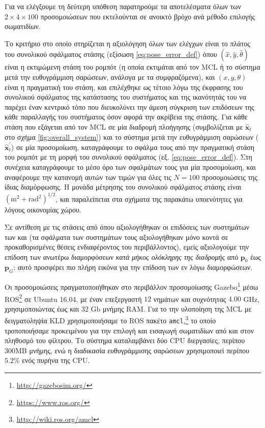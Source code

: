 Για να ελέγξουμε τη δεύτερη υπόθεση παρατηρούμε τα αποτελέσματα όλων των
$2\times4\times100$ προσομοιώσεων που εκτελούνται σε ανοικτό βρόχο ανά μέθοδο
επιλογής σωματιδίων.

Το κριτήριο στο οποίο στηρίζεται η αξιολόγηση όλων των ελέγχων είναι το πλάτος
του συνολικού σφάλματος στάσης (εξίσωση \ref{eq:pose_error_def}) όπου
$(\hat{x}, \hat{y}, \hat{\theta})$ είναι η εκτιμώμενη στάση του ρομπότ (η οποία
εκτιμάται από τον MCL ή το σύστημα μετά την ευθυγράμμιση σαρώσεων, ανάλογα με
τα συμφραζόμενα), και $(x,y,\theta)$ είναι η πραγματική του στάση, και
επιλέχθηκε ως τέτοιο λόγω της έκφρασης του συνολικού σφάλματος της κατάστασης
του συστήματος και της ικανότητάς του να παρέχει έναν κεντρικό τόπο που
διευκολύνει την άμεση σύγκριση των επιδόσεων της κάθε παραλλαγής του συστήματος
όσον αφορά την ακρίβεια της στάσης. Για κάθε στάση που εξάγεται από τον MCL σε
μία διαδρομή πλοήγησης (συμβολίζεται με $\hat{\bm{x}}_t$ στο σχήμα
\ref{fig:overall_system}) και το σύστημα μετά την ευθυγράμμιση σαρώσεων
($\hat{\bm{x}}^{\prime}_t$) σε μία προσομοίωση, καταγράφουμε το σφάλμα τους από
την πραγματική στάση του ρομπότ με τη μορφή του συνολικού σφάλματος (εξ.
\ref{eq:pose_error_def}). Στη συνέχεια καταγράφουμε το μέσο όρο των
σφαλμάτων τους για μία προσομοίωση, και αναφέρουμε την κατανομή αυτών των τιμών
για όλες τις $N = 100$ προσομοιώσεις της ίδιας διαμόρφωσης. Η μονάδα μέτρησης
του συνολικού σφάλματος στάσης είναι $(\text{m}^2+\text{rad}^2)^{1/2}$, και
παραλείπεται στα σχήματα της παρακάτω υποενότητες για λόγους οικονομίας χώρου.

Σε αντίθεση με τις στάσεις από όπου αξιολογήθηκαν οι επιδόσεις των συστημάτων
των \cite{Rowekamper2012a} και \cite{Vasiljevic2016a}(τα σφάλματα των
συστημάτων τους αξιολογήθηκαν μόνο κοντά σε προκαθορισμένες θέσεις
ενδιαφέροντος του περιβάλλοντος), εμείς αξιολογούμε την επίδοση των ανωτέρω
διαμορφόσεων \textit{κατά μήκος ολόκληρης της διαδρομής} από $\bm{p}_0$ έως
$\bm{p}_G$: αυτό προσφέρει πιο πλήρη εικόνα για την επίδοση των εν λόγω
διαμορφώσεων.

Οι προσομοιώσεις πραγματοποιήθηκαν στο περιβάλλον προσομοίωσης
Gazebo\footnote{\url{http://gazebosim.org/}} μέσω
ROS\footnote{\url{https://www.ros.org/}} σε Ubuntu 16.04, με έναν επεξεργαστή
$12$ νημάτων και συχνότητας $4.00$ GHz, χρησιμοποιώντας έως και $32$ Gb μνήμης
RAM. Για το την υλοποίηση της MCL με δειγματοληψία KLD χρησιμοποιήσαμε το ROS
πακέτο \texttt{amcl},\footnote{\url{http://wiki.ros.org/amcl}} το οποίο
τροποποιήσαμε προκειμένου για την επιλογή και εισαγωγή σωματιδίων από και στον
πληθυσμό του φίλτρου. Το σύστημα καταλαμβάνει δύο CPU διεργασίες, περίπου 300MB
μνήμης, ενώ η διαδικασία ευθυγράμμισης σαρώσεων χρησιμοποιεί περίπου $5.2\%$
ενός πυρήνα της CPU.

